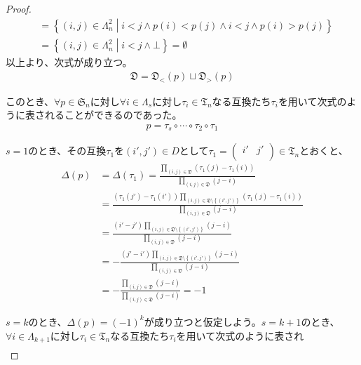 \documentclass[dvipdfmx]{jsarticle}
\begin{document}
\begin{proof}
\begin{align*}
&= \left\{ (i,j) \in \varLambda_{n}^{2} \middle| i < j \land p(i) < p(j) \land i < j \land p(i) > p(j) \right\}\\
&= \left\{ (i,j) \in \varLambda_{n}^{2} \middle| i < j \land \bot \right\} = \emptyset
\end{align*}
以上より、次式が成り立つ。
\begin{align*}
\mathfrak{D} =\mathfrak{D}_{<}(p) \sqcup \mathfrak{D}_{>}(p)
\end{align*}\par
このとき、$\forall p \in \mathfrak{S}_{n}$に対し$\forall i \in \varLambda_{s}$に対し$\tau_{i} \in \mathfrak{T}_{n}$なる互換たち$\tau_{i}$を用いて次式のように表されることができるのであった。
\begin{align*}
p = \tau_{s} \circ \cdots \circ \tau_{2} \circ \tau_{1}
\end{align*}\par
$s = 1$のとき、その互換$\tau_{1}$を$\left( i',j' \right)\mathfrak\in {D}$として$\tau_{1} = \begin{pmatrix}
i' & j' \\
\end{pmatrix} \in \mathfrak{T}_{n}$とおくと、
\begin{align*}
\varDelta(p) &= \varDelta\left( \tau_{1} \right) = \frac{\prod_{(i,j)\in \mathfrak{D}} \left( \tau_{1}(j) - \tau_{1}(i) \right)}{\prod_{(i,j)\in \mathfrak{D} } (j - i)} \\
&= \frac{\left( \tau_{1}\left( j' \right) - \tau_{1}\left( i' \right) \right)\prod_{(i,j)\in \mathfrak{D} \setminus \left\{ \left( i',j' \right) \right\} } \left( \tau_{1}(j) - \tau_{1}(i) \right)}{\prod_{(i,j)\in \mathfrak{D} } (j - i)}\\
&= \frac{\left( i' - j' \right)\prod_{(i,j)\in \mathfrak{D} \setminus\left\{ \left( i',j' \right) \right\} } (j - i)}{\prod_{(i,j)\in \mathfrak{D}} (j - i)}\\
&= - \frac{\left( j' - i' \right)\prod_{(i,j)\in \mathfrak{D} \setminus \left\{ \left( i',j' \right) \right\} } (j - i)}{\prod_{(i,j)\in \mathfrak{D} } (j - i)}\\
&= - \frac{\prod_{(i,j)\in \mathfrak{D} } (j - i)}{\prod_{(i,j)\in \mathfrak{D} } (j - i)} = - 1
\end{align*}\par
$s = k$のとき、$\varDelta(p) = ( - 1)^{k}$が成り立つと仮定しよう。$s = k + 1$のとき、$\forall i \in \varLambda_{k + 1}$に対し$\tau_{i} \in \mathfrak{T}_{n}$なる互換たち$\tau_{i}$を用いて次式のように表され
\begin{align*}

\end{align*}
\end{proof}
\end{document}
